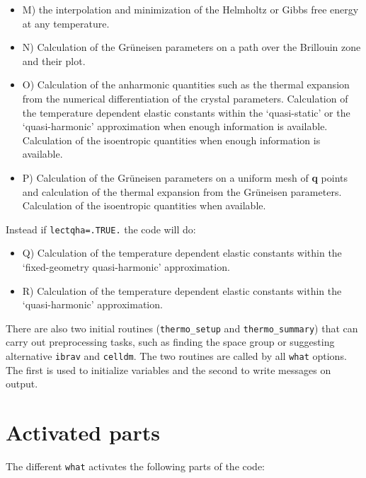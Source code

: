 \documentclass[12pt,a4paper]{article}
\begin{document}
\begin{itemize}

\item
M) the interpolation and minimization of the 
Helmholtz or Gibbs free energy at any temperature.

\item
N) Calculation of the Gr\"uneisen parameters on a path over the Brillouin
zone and their plot.

\item
O) Calculation of the anharmonic quantities such as the thermal expansion
from the numerical differentiation of the crystal parameters. 
Calculation of the temperature dependent elastic constants within 
the `quasi-static' or the `quasi-harmonic' approximation when enough 
information is available. Calculation of the isoentropic quantities when 
enough information is available. 

\item
P) Calculation of the Gr\"uneisen parameters on a uniform mesh of {\bf q} 
points and calculation of the thermal expansion from the Gr\"uneisen parameters.
Calculation of the isoentropic quantities when available.
\end{itemize}

Instead if \texttt{lectqha=.TRUE.} the code will do:
\begin{itemize}
\item
Q) Calculation of the temperature dependent elastic constants within the
`fixed-geometry quasi-harmonic' approximation.

\item
R) Calculation of the temperature dependent elastic constants within the
`quasi-harmonic' approximation.


\end{itemize}
There are also two initial routines (\texttt{thermo\_setup} and 
\texttt{thermo\_summary}) that can carry out preprocessing tasks, such as 
finding the space group or suggesting alternative \texttt{ibrav} and 
\texttt{celldm}. The two routines are called by all \texttt{what} options.
The first is used to initialize variables and the second to write messages 
on output.

\newpage
\section{\color{coral}Activated parts}

The different \texttt{what} activates the following parts of the code:
\end{document}
